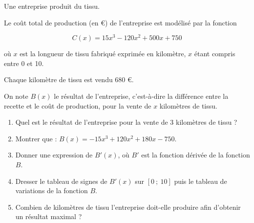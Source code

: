 \medskip

Une entreprise produit du tissu.

Le coût total de production (en \euro) de l'entreprise est modélisé par la fonction

\[C(x)= 15x^3 - 120x^2 + 500x + 750\] 

où $x$ est la longueur de tissu fabriqué exprimée en kilomètre, $x$ étant compris entre 0 et 10.

Chaque kilomètre de tissu est vendu $680$ \euro.

On note $B(x)$ le résultat de l'entreprise, c’est-à-dire la différence entre la recette et le coût de production, pour la vente de $x$ kilomètres de tissu.

\medskip

\begin{enumerate}
\item Quel est le résultat de l’entreprise pour la vente de 3 kilomètres de tissu ?
\item Montrer que : $B(x)=-15x^3+120x^2+180x-750$.
\item Donner une expression de $B'(x)$, où $B'$ est la fonction dérivée de la fonction $B$.
\item Dresser le tableau de signes de $B'(x)$ sur $[0~;~10]$ puis le tableau de variations de la fonction $B$.
\item Combien de kilomètres de tissu l’entreprise doit-elle produire afin d’obtenir un résultat maximal ?
\end{enumerate}
